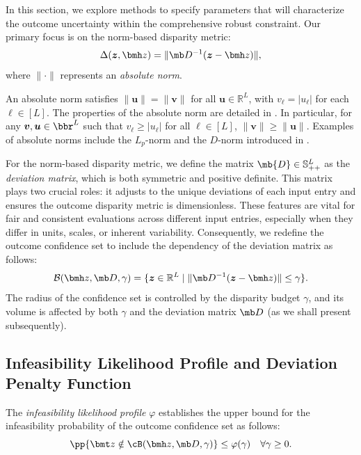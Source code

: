 \documentclass[opre, blindrev]{informs4}
\newcommand{\1}[1]{\mathds{1}{\left(#1\right)}}
\begin{document}
In this section, we explore methods to specify parameters that will characterize the outcome uncertainty within the comprehensive robust constraint. Our primary focus is on the norm-based disparity metric:
$$
\Delta(\bm z,\bmh z) = \| \mb D^{-1} (\bm z - \bmh z) \|,
$$
where $\|\cdot\|$ represents an {\em absolute norm}. 

\begin{definition}
\textnormal{
An absolute norm satisfies $\|\bm u\| = \| \bm v\|$ for all $\bm u \in \mathbb{R}^L$, with $v_\ell = |u_\ell|$ for each $\ell \in [L]$. The properties of the absolute norm are detailed in \cite{bertsimas2006tractable}. In particular, for any $\bm v, \bm u \in \bbr^L$ such that $v_\ell\geq |u_\ell|$ for all $\ell \in [L]$, $\|\bm v\|\geq \|\bm u\|$. Examples of absolute norms include the $L_p$-norm and the $D$-norm introduced in \cite{bertsimas2004robust}.
}
\end{definition}

For the norm-based disparity metric, we define the matrix $\mb{D} \in \mathbb{S}^L_{++}$ as the {\em deviation matrix}, which is both symmetric and positive definite. This matrix plays two crucial roles: it adjusts to the unique deviations of each input entry and ensures the outcome disparity metric is dimensionless. These features are vital for fair and consistent evaluations across different input entries, especially when they differ in units, scales, or inherent variability. Consequently, we redefine the outcome confidence set to include the dependency of the deviation matrix as follows:
$$
\mathcal{B}(\bmh z, \mb D, \gamma) = \{ \bm z \in \mathbb{R}^L \;|\; \| \mb D^{-1} (\bm z - \bmh z) \| \leq \gamma \}.
$$
The radius of the confidence set is controlled by the disparity budget $\gamma$, and its volume is affected by both $\gamma$ and the deviation matrix $\mb D$ (as we shall present subsequently).

\subsection*{Infeasibility Likelihood Profile and Deviation Penalty Function}

The \textit{infeasibility likelihood  profile} $\varphi$ establishes the upper bound for the infeasibility probability of the outcome confidence set as follows:
$$
\pp{\bmt z \notin \cB(\bmh z,\mb D, \gamma)} \leq \varphi(\gamma) ~~~\forall \gamma \geq 0.
$$
\end{document}
